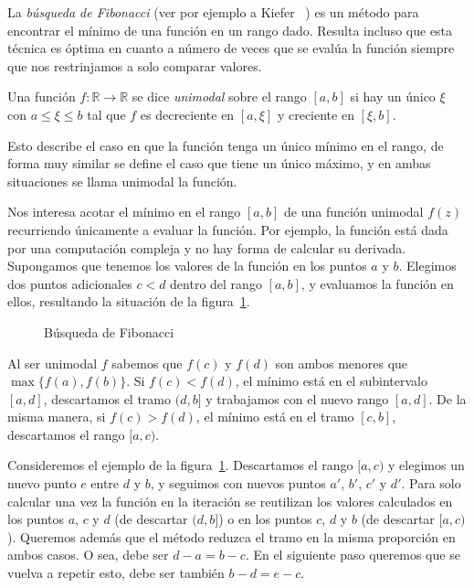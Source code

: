   La \emph{búsqueda de Fibonacci}
  (ver por ejemplo a Kiefer~%
    \cite{kiefer53:_seq_minimax_search_maximum})
  es un método para encontrar el mínimo
  de una función en un rango dado.
  Resulta incluso que esta técnica es óptima
  en cuanto a número de veces que se evalúa la función
  siempre que nos restrinjamos a solo comparar valores.
  \begin{definition}
    Una función \(f : \mathbb{R} \rightarrow \mathbb{R}\)
    se dice \emph{unimodal} sobre el rango \([a, b]\)%
    si hay un único \(\xi\) con \(a \le \xi \le b\) tal que
    \(f\) es decreciente en \([a, \xi]\)
    y creciente en \([\xi, b]\).
  \end{definition}
  Esto describe el caso en que la función tenga un único mínimo
  en el rango,
  de forma muy similar se define el caso que tiene un único máximo,
  y en ambas situaciones se llama unimodal la función.

  Nos interesa acotar el mínimo en el rango \([a, b]\)
  de una función unimodal \(f(z)\)
  recurriendo únicamente a evaluar la función.
  Por ejemplo,
  la función está dada por una computación compleja
  y no hay forma de calcular su derivada.
  Supongamos que tenemos los valores de la función
  en los puntos \(a\) y \(b\).
  Elegimos dos puntos adicionales \(c < d\)
  dentro del rango \([a, b]\),
  y evaluamos la función en ellos,
  resultando la situación
  de la figura~\ref{fig:Fibonacci-search-step}.
  \begin{figure}[htbp]
    \centering
    \caption{Búsqueda de Fibonacci}
    \label{fig:Fibonacci-search-step}
  \end{figure}
  Al ser unimodal \(f\)
  sabemos que \(f(c)\) y \(f(d)\)
  son ambos menores que \(\max \{ f(a), f(b) \}\).
  Si \(f(c) < f(d)\),
  el mínimo está en el subintervalo \([a, d]\),
  descartamos el tramo \((d, b]\)
  y trabajamos con el nuevo rango \([a, d]\).
  De la misma manera,
  si \(f(c) > f(d)\),
  el mínimo está en el tramo \([c, b]\),
  descartamos el rango \([a, c)\).

  Consideremos el ejemplo
  de la figura~\ref{fig:Fibonacci-search-step}.
  Descartamos el rango \([a, c)\)
  y elegimos un nuevo punto \(e\) entre \(d\) y \(b\),
  y seguimos con nuevos puntos \(a'\), \(b'\), \(c'\) y \(d'\).
  Para solo calcular una vez la función en la iteración
  se reutilizan los valores calculados
  en los puntos \(a\), \(c\) y \(d\)
  (de descartar \((d, b]\))
  o en los puntos \(c\), \(d\) y \(b\)
  (de descartar \([a, c)\)).
  Queremos además
  que el método reduzca el tramo en la misma proporción
  en ambos casos.
  O sea,
  debe ser \(d - a = b - c\).
  En el siguiente paso queremos que se vuelva a repetir esto,
  debe ser también
  \(b - d = e - c\).

